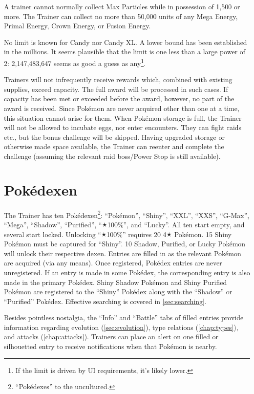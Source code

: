 A trainer cannot normally collect Max Particles while in possession of 1,500 or more.
The Trainer can collect no more than 50,000 units of any Mega Energy,
 Primal Energy, Crown Energy, or Fusion Energy.

No limit is known for Candy nor Candy XL\@.
A lower bound has been established in the millions.
It seems plausible that the limit is one less than a large power of 2:
  2,147,483,647 seems as good a guess as any\footnote{If the limit is driven by UI requirements, it's likely lower.}.

Trainers will not infrequently receive rewards which, combined with existing supplies, exceed capacity.
The full award will be processed in such cases.
If capacity has been met or exceeded before the award, however, no part of the award is received.
Since Pokémon are never acquired other than one at a time, this situation cannot
 arise for them.
When Pokémon storage is full, the Trainer will not be allowed to incubate eggs,
 nor enter encounters.
They can fight raids etc., but the bonus challenge will be skipped.
Having upgraded storage or otherwise made space available, the Trainer can
 reenter and complete the challenge (assuming the relevant raid boss/Power Stop is
 still available).

\section{Pokédexen\label{sec:dexen}}
The Trainer has ten Pokédexen\footnote{``Pokédexes'' to the uncultured.}:
  ``Pokémon'', ``Shiny'', ``XXL'', ``XXS'', ``G-Max'', ``Mega'', ``Shadow'',
  ``Purified'', ``🟉100\%'', and ``Lucky''.
All ten start empty, and several start locked.
Unlocking ``🟉100\%'' requires 20 4🟉 Pokémon.
15 Shiny Pokémon must be captured for ``Shiny''.
10 Shadow, Purified, or Lucky Pokémon will unlock their respective dexen.
Entries are filled in as the relevant Pokémon are acquired (via any means).
Once registered, Pokédex entries are never unregistered.
If an entry is made in some Pokédex, the corresponding entry is also made
  in the primary Pokédex.
Shiny Shadow Pokémon and Shiny Purified Pokémon are registered to the
  ``Shiny'' Pokédex along with the ``Shadow'' or ``Purified'' Pokédex.
Effective searching is covered in \autoref{sec:searching}.

Besides pointless nostalgia, the ``Info'' and ``Battle'' tabs of filled entries
  provide information regarding evolution (\autoref{sec:evolution}), type
  relations (\autoref{chap:types}), and attacks (\autoref{chap:attacks}).
Trainers can place an alert on one filled or silhouetted entry to receive
  notifications when that Pokémon is nearby.

